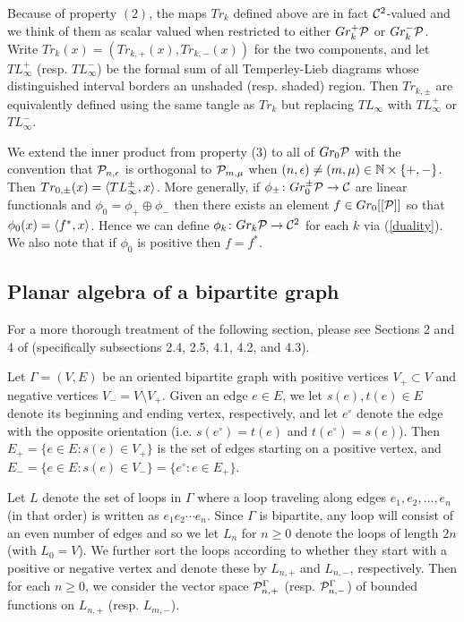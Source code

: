 Because of property $(2)$, the maps $Tr_k$ defined above are in fact $\mathcal C^2$-valued and we think of them as scalar valued when restricted to either $Gr_k^+\mathcal{P}$ or $Gr_k^-\mathcal{P}$. Write $Tr_k(x)=(Tr_{k,+}(x), Tr_{k,-}(x))$ for the two components, and let $TL_\infty^+$ (resp. $TL_\infty^-$) be the formal sum of all Temperley-Lieb diagrams whose distinguished interval borders an unshaded (resp. shaded) region. Then $Tr_{k,\pm}$ are equivalently defined using the same tangle as $Tr_k$ but replacing $TL_{\infty}$ with $TL_{\infty}^+$ or $TL_\infty^-$.

We extend the inner product from property (3) to all of $Gr_0\mathcal{P}$ with the convention that $\mathcal{P}_{n,\epsilon}$ is orthogonal to $\mathcal{P}_{m,\mu}$ when $(n,\epsilon)\neq (m,\mu)\in \mathbb{N}\times \{+,-\}$. Then $Tr_{0,\pm}(x)=\left\langle TL_\infty^{\pm}, x\right\rangle$. More generally, if $\phi_{\pm}\colon Gr_0^{\pm}\mathcal{P}\to \mathcal C$ are linear functionals and $\phi_0=\phi_+\oplus \phi_-$  then there exists an element $f\in Gr_0[[\mathcal{P}]]$ so that $\phi_0(x)=\left\langle f^*, x\right\rangle$. Hence we can define $\phi_k \colon Gr_k\mathcal{P}\to \mathcal C^2$ for each $k$ via (\ref{duality}). We also note that if $\phi_0$ is positive then $f=f^*$.




\subsection{Planar algebra of a bipartite graph}

For a more thorough treatment of the following section, please see Sections 2 and 4 of \cite{GJS10} (specifically subsections 2.4, 2.5, 4.1, 4.2, and 4.3).

Let $\Gamma=(V,E)$ be an oriented bipartite graph with positive vertices $V_+\subset V$ and negative vertices $V_-=V\setminus V_+$. Given an edge $e\in E$, we let $s(e),t(e)\in E$ denote its beginning and ending vertex, respectively, and let $e^\circ$ denote the edge with the opposite orientation (i.e. $s(e^\circ)=t(e)$ and $t(e^\circ)=s(e)$). Then $E_+=\{e\in E\colon s(e)\in V_+\}$ is the set of edges starting on a positive vertex, and $E_-=\{e\in E\colon s(e)\in V_-\}= \{e^\circ \colon e\in E_+\}$.

Let $L$ denote the set of loops in $\Gamma$ where a loop traveling along edges $e_1,e_2,\ldots, e_n$ (in that order) is written as $e_1e_2\cdots e_n$. Since $\Gamma$ is bipartite, any loop will consist of an even number of edges and so we let $L_n$ for $n\geq 0$ denote the loops of length $2n$ (with $L_0=V$). We further sort the loops according to whether they start with a positive or negative vertex and denote these by $L_{n,+}$ and $L_{n,-}$, respectively. Then for each $n\geq 0$, we consider the vector space $\mathcal{P}_{n,+}^\Gamma$ (resp. $\mathcal{P}_{n,-}^\Gamma$) of bounded functions on $L_{n,+}$ (resp. $L_{m,-}$).

